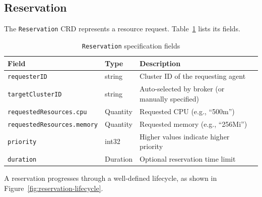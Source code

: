 \subsection{Reservation}
\label{subsec:reservation}

The \texttt{Reservation} CRD represents a resource request. Table~\ref{tab:reservation} lists its fields.

\begin{table}[htbp]
\centering
\caption{\texttt{Reservation} specification fields}
\label{tab:reservation}
\begin{tabular}{@{}llp{7cm}@{}}
\toprule
\textbf{Field} & \textbf{Type} & \textbf{Description} \\
\midrule
\texttt{requesterID} & string & Cluster ID of the requesting agent \\
\texttt{targetClusterID} & string & Auto-selected by broker (or manually specified) \\
\texttt{requestedResources.cpu} & Quantity & Requested CPU (e.g., ``500m'') \\
\texttt{requestedResources.memory} & Quantity & Requested memory (e.g., ``256Mi'') \\
\texttt{priority} & int32 & Higher values indicate higher priority \\
\texttt{duration} & Duration & Optional reservation time limit \\
\bottomrule
\end{tabular}
\end{table}

A reservation progresses through a well-defined lifecycle, as shown in Figure~\ref{fig:reservation-lifecycle}.

